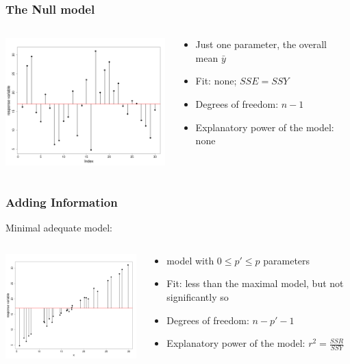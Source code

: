 \begin{frame}\frametitle{The Null model}
\begin{columns}
\begin{column}{0.6\textwidth}
\includegraphics[width=6.5cm]{img/nullmodel.png}
\end{column}
\begin{column}{0.4\textwidth}
\begin{itemize}
\item Just one parameter, the overall mean $\bar{y}$
\item Fit: none; $SSE = SSY$
\item Degrees of freedom: $n-1$
\item Explanatory power of the model: none
\end{itemize}
\end{column}
\end{columns}
\end{frame}

\begin{frame}\frametitle{Adding Information}
Minimal adequate model:
\begin{columns}
\begin{column}{0.6\textwidth}
\includegraphics[width=6.5cm]{img/minimalmodel.png}
\end{column}
\begin{column}{0.4\textwidth}
\begin{itemize}
\item model with $0 \le p' \le p$ parameters
\item Fit: less than the maximal model, but not significantly so
\item Degrees of freedom: $n-p'-1$
\item Explanatory power of the model: $r^2 = \frac{SSR}{SSY}$    
\end{itemize}
\end{column}
\end{columns}
\end{frame}

